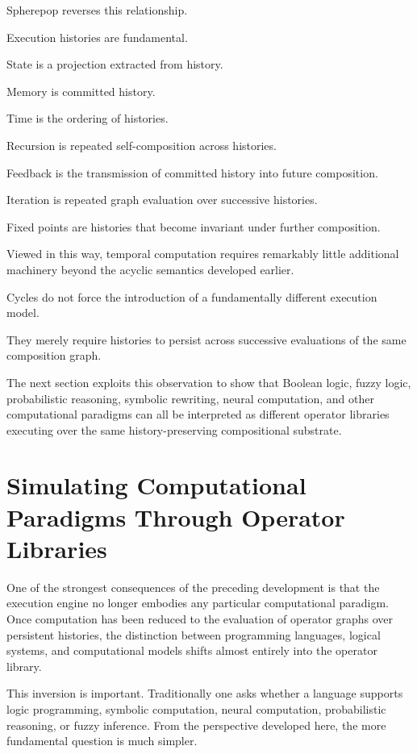 \documentclass[12pt,oneside]{article}
\begin{document}
Spherepop reverses this relationship.

Execution histories are fundamental.

State is a projection extracted from history.

Memory is committed history.

Time is the ordering of histories.

Recursion is repeated self-composition across histories.

Feedback is the transmission of committed history into future composition.

Iteration is repeated graph evaluation over successive histories.

Fixed points are histories that become invariant under further composition.

Viewed in this way, temporal computation requires remarkably little additional machinery beyond the acyclic semantics developed earlier.

Cycles do not force the introduction of a fundamentally different execution model.

They merely require histories to persist across successive evaluations of the same composition graph.

The next section exploits this observation to show that Boolean logic, fuzzy logic, probabilistic reasoning, symbolic rewriting, neural computation, and other computational paradigms can all be interpreted as different operator libraries executing over the same history-preserving compositional substrate.

\section{Simulating Computational Paradigms Through Operator Libraries}

One of the strongest consequences of the preceding development is that the execution engine no longer embodies any particular computational paradigm. Once computation has been reduced to the evaluation of operator graphs over persistent histories, the distinction between programming languages, logical systems, and computational models shifts almost entirely into the operator library.

This inversion is important. Traditionally one asks whether a language supports logic programming, symbolic computation, neural computation, probabilistic reasoning, or fuzzy inference. From the perspective developed here, the more fundamental question is much simpler.
\end{document}
